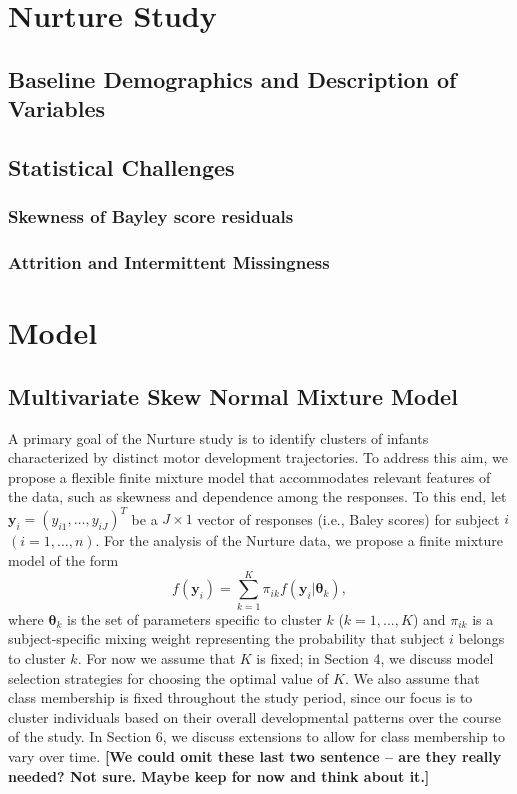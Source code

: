 \documentclass[useAMS,referee]{biom}
\begin{document}
\newpage

\section{Nurture Study}
\label{s:nurt}
\subsection{Baseline Demographics and Description of Variables}

\subsection{Statistical Challenges}
\subsubsection{Skewness of Bayley score residuals}
\subsubsection{Attrition and Intermittent Missingness}

\newpage

\section{Model}
\label{s:model}

\subsection{Multivariate Skew Normal Mixture Model}

A primary goal of the Nurture study is to identify clusters of infants characterized by distinct motor development trajectories. To address this aim, we propose a flexible finite mixture model that accommodates relevant features of the data, such as skewness and dependence among the responses. To this end, let $\mathbf{y}_{i}=(y_{i1},\ldots,y_{iJ})^T$ be a $J \times 1$ vector of responses (i.e., Baley scores) for subject $i$ $(i=1,\ldots,n)$. For the analysis of the Nurture data, we propose a finite mixture model of the form
\begin{equation}
f(\mathbf{y}_i) = \sum_{k = 1}^{K} \pi_{ik} f(\mathbf{y}_i|\boldsymbol\theta_k),
\end{equation}
where $\boldsymbol\theta_k$ is the set of parameters specific to cluster $k$ ($k = 1,...,K$) and $\pi_{ik}$ is a subject-specific mixing weight representing the probability that subject $i$ belongs to cluster $k$. For now we assume that $K$ is fixed; in Section 4, we discuss model selection strategies for choosing the optimal value of $K$. We also assume that class membership is fixed throughout the study period, since our focus is to cluster individuals based on their overall developmental patterns over the course of the study. In Section 6, we discuss extensions to allow for class membership to vary over time. \textbf{[We could omit these last two sentence -- are they really needed? Not sure. Maybe keep for now and think about it.]}
\end{document}
